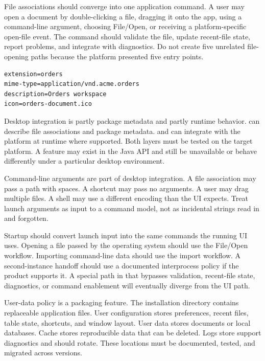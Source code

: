 File associations should converge into one application command. A user may open a document by double-clicking a file, dragging it onto the app, using a command-line argument, choosing File/Open, or receiving a platform-specific open-file event. The command should validate the file, update recent-file state, report problems, and integrate with diagnostics. Do not create five unrelated file-opening paths because the platform presented five entry points.

\begin{lstlisting}[caption={A jpackage file-association properties file.}]
extension=orders
mime-type=application/vnd.acme.orders
description=Orders workspace
icon=orders-document.ico
\end{lstlisting}

Desktop integration is partly package metadata and partly runtime behavior.  can describe file associations and package metadata.  and  can integrate with the platform at runtime where supported. Both layers must be tested on the target platform. A feature may exist in the Java API and still be unavailable or behave differently under a particular desktop environment.

Command-line arguments are part of desktop integration. A file association may pass a path with spaces. A shortcut may pass no arguments. A user may drag multiple files. A shell may use a different encoding than the UI expects. Treat launch arguments as input to a command model, not as incidental strings read in  and forgotten.

Startup should convert launch input into the same commands the running UI uses. Opening a file passed by the operating system should use the File/Open workflow. Importing command-line data should use the import workflow. A second-instance handoff should use a documented interprocess policy if the product supports it. A special path in  that bypasses validation, recent-file state, diagnostics, or command enablement will eventually diverge from the UI path.

User-data policy is a packaging feature. The installation directory contains replaceable application files. User configuration stores preferences, recent files, table state, shortcuts, and window layout. User data stores documents or local databases. Cache stores reproducible data that can be deleted. Logs store support diagnostics and should rotate. These locations must be documented, tested, and migrated across versions.

